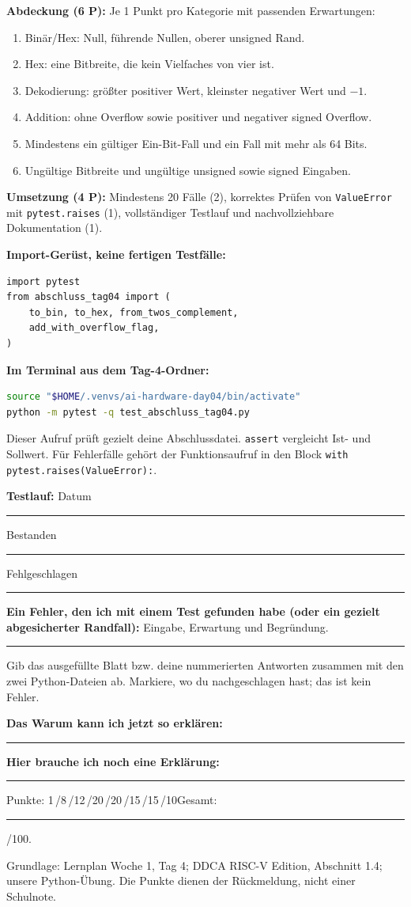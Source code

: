 \documentclass[10pt,a4paper]{article}
\newcommand{\block}[1]{\par\vspace{2mm}{\sffamily\large\bfseries #1}\par}
\newcommand{\code}[1]{\texttt{#1}}
\newcommand{\antwort}[1]{\par\vspace{#1}\hrule\vspace{2mm}}
\begin{document}
\textbf{Abdeckung (6 P):} Je 1 Punkt pro Kategorie mit passenden Erwartungen:
\begin{enumerate}
\item Binär/Hex: Null, führende Nullen, oberer unsigned Rand.
\item Hex: eine Bitbreite, die kein Vielfaches von vier ist.
\item Dekodierung: größter positiver Wert, kleinster negativer Wert und $-1$.
\item Addition: ohne Overflow sowie positiver und negativer signed Overflow.
\item Mindestens ein gültiger Ein-Bit-Fall und ein Fall mit mehr als 64 Bits.
\item Ungültige Bitbreite und ungültige unsigned sowie signed Eingaben.
\end{enumerate}
\textbf{Umsetzung (4 P):} Mindestens 20 Fälle (2), korrektes Prüfen von
\code{ValueError} mit \code{pytest.raises} (1), vollständiger Testlauf und
nachvollziehbare Dokumentation (1).

\textbf{Import-Gerüst, keine fertigen Testfälle:}
\begin{lstlisting}
import pytest
from abschluss_tag04 import (
    to_bin, to_hex, from_twos_complement,
    add_with_overflow_flag,
)
\end{lstlisting}
\textbf{Im Terminal aus dem Tag-4-Ordner:}
\begin{lstlisting}[language=bash]
source "$HOME/.venvs/ai-hardware-day04/bin/activate"
python -m pytest -q test_abschluss_tag04.py
\end{lstlisting}
Dieser Aufruf prüft gezielt deine Abschlussdatei. \code{assert} vergleicht
Ist- und Sollwert. Für Fehlerfälle gehört der Funktionsaufruf in den Block
\code{with pytest.raises(ValueError):}.

\textbf{Testlauf:} Datum \rule{30mm}{0.3pt}\quad Bestanden \rule{15mm}{0.3pt}
\quad Fehlgeschlagen \rule{15mm}{0.3pt}

\textbf{Ein Fehler, den ich mit einem Test gefunden habe (oder ein gezielt
abgesicherter Randfall):} Eingabe, Erwartung und Begründung.
\antwort{12mm}

\block{Abgabe und Rückblick}
Gib das ausgefüllte Blatt bzw. deine nummerierten Antworten zusammen mit den
zwei Python-Dateien ab. Markiere, wo du nachgeschlagen hast; das ist kein Fehler.
\par
\textbf{Das Warum kann ich jetzt so erklären:}\antwort{9mm}
\textbf{Hier brauche ich noch eine Erklärung:}\antwort{9mm}
\small Punkte: 1\,/8\,/12\,/20\,/20\,/15\,/15\,/10\qquad Gesamt: \rule{12mm}{0.3pt}/100.
\par Grundlage: Lernplan Woche 1, Tag 4; DDCA RISC-V Edition, Abschnitt 1.4;
unsere Python-Übung. Die Punkte dienen der Rückmeldung, nicht einer Schulnote.
\end{document}
